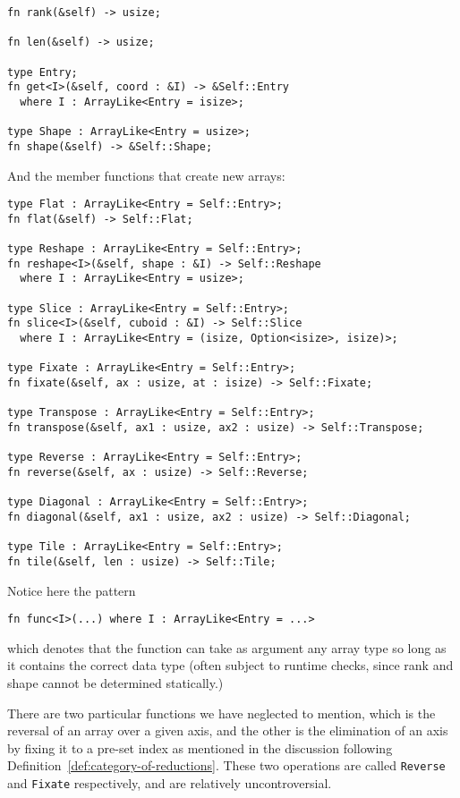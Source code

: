\documentclass{DIKU-report-variant}
\begin{document}
\begin{lstlisting}
fn rank(&self) -> usize;

fn len(&self) -> usize;

type Entry;
fn get<I>(&self, coord : &I) -> &Self::Entry
  where I : ArrayLike<Entry = isize>;

type Shape : ArrayLike<Entry = usize>;
fn shape(&self) -> &Self::Shape;
\end{lstlisting}

And the member functions that create new arrays:

\begin{lstlisting}
type Flat : ArrayLike<Entry = Self::Entry>;
fn flat(&self) -> Self::Flat;

type Reshape : ArrayLike<Entry = Self::Entry>;
fn reshape<I>(&self, shape : &I) -> Self::Reshape
  where I : ArrayLike<Entry = usize>;

type Slice : ArrayLike<Entry = Self::Entry>;
fn slice<I>(&self, cuboid : &I) -> Self::Slice
  where I : ArrayLike<Entry = (isize, Option<isize>, isize)>;

type Fixate : ArrayLike<Entry = Self::Entry>;
fn fixate(&self, ax : usize, at : isize) -> Self::Fixate;

type Transpose : ArrayLike<Entry = Self::Entry>;
fn transpose(&self, ax1 : usize, ax2 : usize) -> Self::Transpose;

type Reverse : ArrayLike<Entry = Self::Entry>;
fn reverse(&self, ax : usize) -> Self::Reverse;

type Diagonal : ArrayLike<Entry = Self::Entry>;
fn diagonal(&self, ax1 : usize, ax2 : usize) -> Self::Diagonal;

type Tile : ArrayLike<Entry = Self::Entry>;
fn tile(&self, len : usize) -> Self::Tile;
\end{lstlisting}

Notice here the pattern
\begin{lstlisting}
fn func<I>(...) where I : ArrayLike<Entry = ...>
\end{lstlisting}
which denotes that the function can take as argument any array type so long
as it contains the correct data type (often subject to runtime checks, since rank
and shape cannot be determined statically.)

There are two particular functions we have neglected to mention, which is the reversal of an array
over a given axis, and the other is the elimination of an axis by fixing it to a pre-set index
as mentioned in the discussion following Definition~\ref{def:category-of-reductions}. These two
operations are called \texttt{Reverse} and \texttt{Fixate} respectively, and are relatively uncontroversial.
\end{document}
